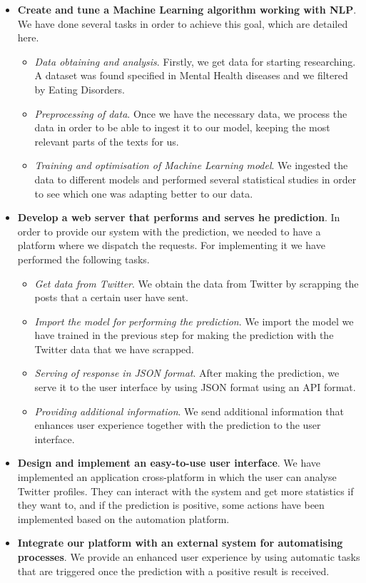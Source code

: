 \begin{itemize}
    \item \textbf{Create and tune a Machine Learning algorithm working with NLP}. We have done several tasks in order to achieve this goal, which are detailed here.
    \begin{itemize}
        \item \textit{Data obtaining and analysis}. Firstly, we get data for starting researching. A dataset was found specified in Mental Health diseases and we filtered by Eating Disorders.
        \item \textit{Preprocessing of data}. Once we have the necessary data, we process the data in order to be able to ingest it to our model, keeping the most relevant parts of the texts for us.
        \item \textit{Training and optimisation of Machine Learning model}. We ingested the data to different models and performed several statistical studies in order to see which one was adapting better to our data.
    \end{itemize}
    \item \textbf{Develop a web server that performs and serves he prediction}. In order to provide our system with the prediction, we needed to have a platform where we dispatch the requests. For implementing it we have performed the following tasks.
    \begin{itemize}
        \item \textit{Get data from Twitter}. We obtain the data from Twitter by scrapping the posts that a certain user have sent.
        \item \textit{Import the model for performing the prediction}. We import the model we have trained in the previous step for making the prediction with the Twitter data that we have scrapped.
        \item \textit{Serving of response in JSON format}. After making the prediction, we serve it to the user interface by using JSON format using an API format.
        \item \textit{Providing additional information}. We send additional information that enhances user experience together with the prediction to the user interface.
    \end{itemize}
    \item \textbf{Design and implement an easy-to-use user interface}. We have implemented an application cross-platform in which the user can analyse Twitter profiles. They can interact with the system and get more statistics if they want to, and if the prediction is positive, some actions have been implemented based on the automation platform.
    \item \textbf{Integrate our platform with an external system for automatising processes}. We provide an enhanced user experience by using automatic tasks that are triggered once the prediction with a positive result is received.
\end{itemize}


